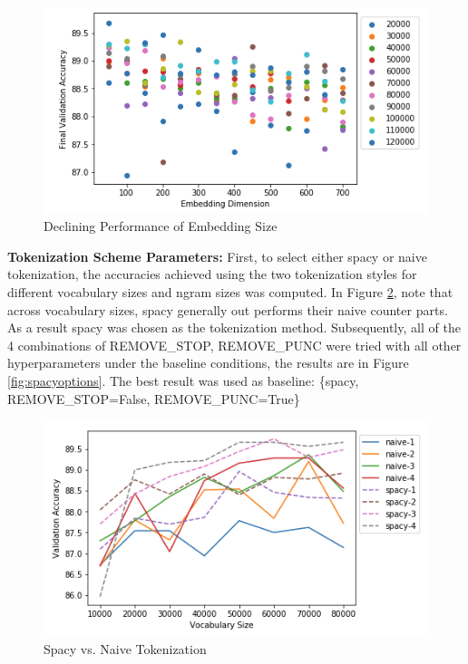 \documentclass[a4paper,10pt]{article}
\begin{document}
\begin{figure}[h]
    \centering
    \includegraphics[scale=0.4]{embedding}
    \caption{Declining Performance of Embedding Size}
    \label{fig:embedding}
\end{figure}


\par
\justify
\textbf{Tokenization Scheme Parameters:} First, to select either spacy or naive tokenization, the accuracies achieved using the two tokenization styles for different vocabulary sizes and ngram sizes was computed. In Figure \ref{fig:spacynaive}, note that across vocabulary sizes, spacy generally out performs their naive counter parts. As a result spacy was chosen as the tokenization method. Subsequently, all of the 4 combinations of REMOVE\_STOP, REMOVE\_PUNC were tried with all other hyperparameters under the baseline conditions, the results are in Figure \ref{fig:spacyoptions}. The best result was used as baseline: \{spacy, REMOVE\_STOP=False, REMOVE\_PUNC=True\}

\begin{figure}[h]
    \centering
    \includegraphics[scale=0.4]{spacynaive}
    \caption{Spacy vs. Naive Tokenization}
    \label{fig:spacynaive}
\end{figure}
\end{document}
